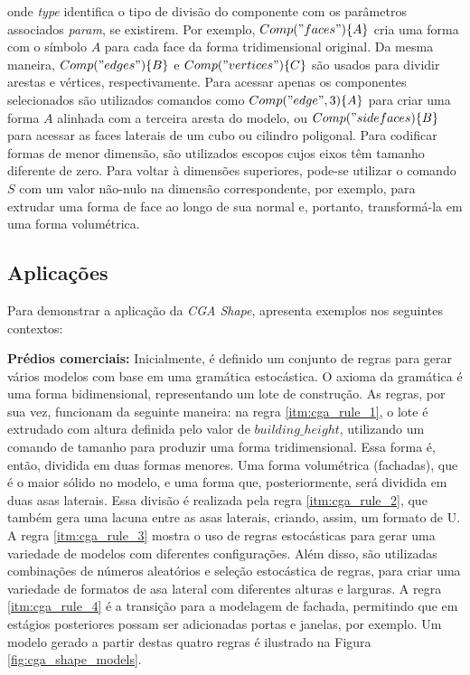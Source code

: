 \vspace{0.5cm}

\noindent onde \textit{type} identifica o tipo de divisão do componente com os parâmetros associados \textit{param}, se existirem. Por exemplo, $Comp("faces") \{A\}$ cria uma forma com o símbolo $A$ para cada face da forma tridimensional original. Da mesma maneira, $Comp("edges") \{B\}$ e $Comp("vertices") \{C\}$ são usados para dividir arestas e vértices, respectivamente. Para acessar apenas os componentes selecionados são utilizados comandos como $Comp("edge", 3) \{A\}$ para criar uma forma $A$ alinhada com a terceira aresta do modelo, ou $Comp("side faces) \{B\}$ para acessar as faces laterais de um cubo ou cilindro poligonal. Para codificar formas de menor dimensão, são utilizados escopos cujos eixos têm tamanho diferente de zero. Para voltar à dimensões superiores, pode-se utilizar o comando $S$ com um valor não-nulo na dimensão correspondente, por exemplo, para extrudar uma forma de face ao longo de sua normal e, portanto, transformá-la em uma forma volumétrica.

\subsection{Aplicações}
\label{sec:cga_exemplos}

Para demonstrar a aplicação da \textit{CGA Shape},  apresenta exemplos nos seguintes contextos:

\textbf{Prédios comerciais:} Inicialmente, é definido um conjunto de regras para gerar vários modelos com base em uma gramática estocástica. O axioma da gramática é uma forma bidimensional, representando um lote de construção. As regras, por sua vez, funcionam da seguinte maneira: na regra \ref{itm:cga_rule_1}, o lote é extrudado com altura definida pelo valor de $building\_height$, utilizando um comando de tamanho para produzir uma forma tridimensional. Essa forma é, então, dividida em duas formas menores. Uma forma volumétrica (fachadas), que é o maior sólido no modelo, e uma forma que, posteriormente, será dividida em duas asas laterais. Essa divisão é realizada pela regra \ref{itm:cga_rule_2}, que também gera uma lacuna entre as asas laterais, criando, assim, um formato de U. A regra \ref{itm:cga_rule_3} mostra o uso de regras estocásticas para gerar uma variedade de modelos com diferentes configurações. Além disso, são utilizadas combinações de números aleatórios e seleção estocástica de regras, para criar uma variedade de formatos de asa lateral com diferentes alturas e larguras. A regra \ref{itm:cga_rule_4} é a transição para a modelagem de fachada, permitindo que em estágios posteriores possam ser adicionadas portas e janelas, por exemplo. Um modelo gerado a partir destas quatro regras é ilustrado na Figura \ref{fig:cga_shape_models}.


